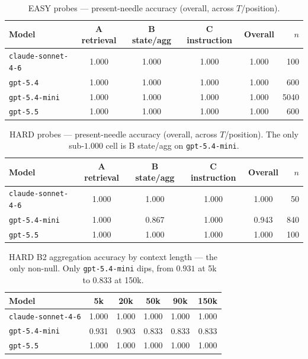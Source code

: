 \documentclass[11pt]{article}
\begin{document}
\begin{table}
  \centering
  \caption{EASY probes --- present-needle accuracy (overall, across
  $T$/position).}
  \label{tab:easy}
  \begin{tabular}{lccccr}
    \toprule
    Model & A retrieval & B state/agg & C instruction & Overall & $n$ \\
    \midrule
    \texttt{claude-sonnet-4-6} & 1.000 & 1.000 & 1.000 & 1.000 & 100 \\
    \texttt{gpt-5.4} & 1.000 & 1.000 & 1.000 & 1.000 & 600 \\
    \texttt{gpt-5.4-mini} & 1.000 & 1.000 & 1.000 & 1.000 & 5040 \\
    \texttt{gpt-5.5} & 1.000 & 1.000 & 1.000 & 1.000 & 600 \\
    \bottomrule
  \end{tabular}
\end{table}

\begin{table}
  \centering
  \caption{HARD probes --- present-needle accuracy (overall, across
  $T$/position). The only sub-$1.000$ cell is B state/agg on
  \texttt{gpt-5.4-mini}.}
  \label{tab:hard}
  \begin{tabular}{lccccr}
    \toprule
    Model & A retrieval & B state/agg & C instruction & Overall & $n$ \\
    \midrule
    \texttt{claude-sonnet-4-6} & 1.000 & 1.000 & 1.000 & 1.000 & 50 \\
    \texttt{gpt-5.4-mini} & 1.000 & 0.867 & 1.000 & 0.943 & 840 \\
    \texttt{gpt-5.5} & 1.000 & 1.000 & 1.000 & 1.000 & 100 \\
    \bottomrule
  \end{tabular}
\end{table}

\begin{table}
  \centering
  \caption{HARD B2 aggregation accuracy by context length --- the only
  non-null. Only \texttt{gpt-5.4-mini} dips, from $0.931$ at 5k to $0.833$
  at 150k.}
  \label{tab:b2}
  \begin{tabular}{lccccc}
    \toprule
    Model & 5k & 20k & 50k & 90k & 150k \\
    \midrule
    \texttt{claude-sonnet-4-6} & 1.000 & 1.000 & 1.000 & 1.000 & 1.000 \\
    \texttt{gpt-5.4-mini} & 0.931 & 0.903 & 0.833 & 0.833 & 0.833 \\
    \texttt{gpt-5.5} & 1.000 & 1.000 & 1.000 & 1.000 & 1.000 \\
    \bottomrule
  \end{tabular}
\end{table}
\end{document}

